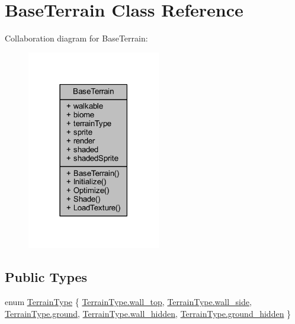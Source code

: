 \hypertarget{class_base_terrain}{}\section{Base\+Terrain Class Reference}
\label{class_base_terrain}


Collaboration diagram for Base\+Terrain\+:
\nopagebreak
\begin{figure}[H]
\begin{center}
\leavevmode
\includegraphics[width=165pt]{class_base_terrain__coll__graph}
\end{center}
\end{figure}
\subsection*{Public Types}
\begin{DoxyCompactItemize}
\item 
enum \mbox{\hyperlink{class_base_terrain_a5b782f4de5e1a2ca1343b4aa89a7dc9a}{Terrain\+Type}} \{ \newline
\mbox{\hyperlink{class_base_terrain_a5b782f4de5e1a2ca1343b4aa89a7dc9aaffe15f42468128e48325cf9206ab42e8}{Terrain\+Type.\+wall\+\_\+top}}, 
\mbox{\hyperlink{class_base_terrain_a5b782f4de5e1a2ca1343b4aa89a7dc9aa3efe6e3a4e45b10c24fca4149a87a786}{Terrain\+Type.\+wall\+\_\+side}}, 
\mbox{\hyperlink{class_base_terrain_a5b782f4de5e1a2ca1343b4aa89a7dc9aa578552719239a72a2d45ad422f67d24d}{Terrain\+Type.\+ground}}, 
\mbox{\hyperlink{class_base_terrain_a5b782f4de5e1a2ca1343b4aa89a7dc9aafc32e3a8457bbaec473b09d4462c1ecd}{Terrain\+Type.\+wall\+\_\+hidden}}, 
\newline
\mbox{\hyperlink{class_base_terrain_a5b782f4de5e1a2ca1343b4aa89a7dc9aa8630ecda1c772caaa8625ab886c66db8}{Terrain\+Type.\+ground\+\_\+hidden}}
 \}
\end{DoxyCompactItemize}
